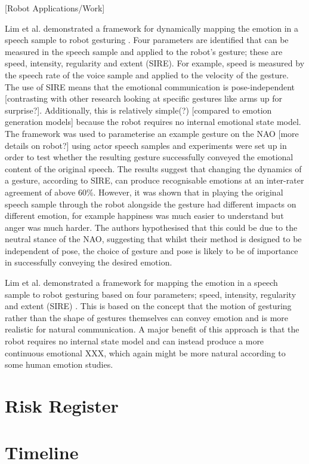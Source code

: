 \documentclass[]{article}
\begin{document}
[Robot Applications/Work]

Lim et al. demonstrated a framework for dynamically mapping the emotion in a speech sample to robot gesturing \cite{lim2011converting}. Four parameters are identified that can be measured in the speech sample and applied to the robot's gesture; these are speed, intensity, regularity and extent (SIRE). For example, speed is measured by the speech rate of the voice sample and applied to the velocity of the gesture. The use of SIRE means that the emotional communication is pose-independent [contrasting with other research looking at specific gestures like arms up for surprise?]. Additionally, this is relatively simple(?) [compared to emotion generation models] because the robot requires no internal emotional state model. The framework was used to parameterise an example gesture on the NAO [more details on robot?] using actor speech samples and experiments were set up in order to test whether the resulting gesture successfully conveyed the emotional content of the original speech. The results suggest that changing the dynamics of a gesture, according to SIRE, can produce recognisable emotions at an inter-rater agreement of above 60\%. However, it was shown that in playing the original speech sample through the robot alongside the gesture had different impacts on different emotion, for example happiness was much easier to understand but anger was much harder. The authors hypothesised that this could be due to the neutral stance of the NAO, suggesting that whilst their method is designed to be independent of pose, the choice of gesture and pose is likely to be of importance in successfully conveying the desired emotion.

Lim et al. demonstrated a framework for mapping the emotion in a speech sample to robot gesturing based on four parameters;  speed, intensity, regularity and extent (SIRE) \cite{lim2011converting}. This is based on the concept that the motion of gesturing rather than the shape of gestures themselves can convey emotion and is more realistic for natural communication. A major benefit of this approach is that the robot requires no internal state model and can instead produce a more continuous emotional XXX, which again might be more natural according to some human emotion studies.  


\section{Risk Register}
\section{Timeline}
\end{document}
